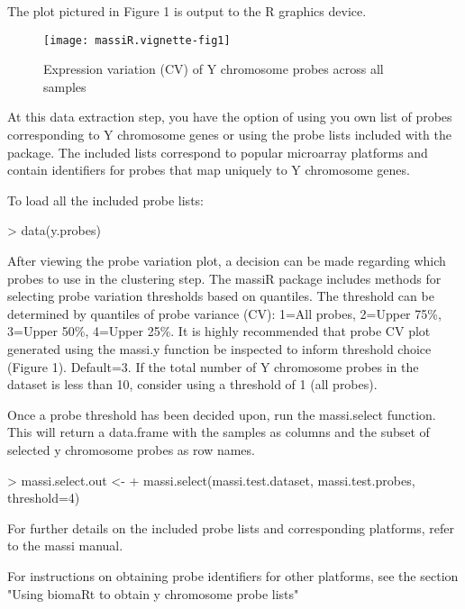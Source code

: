 \documentclass{article}
\begin{document}
The plot pictured in Figure 1 is output to the R graphics device.

\begin{figure}
\begin{center}
\texttt{[image: massiR.vignette-fig1]}
\end{center}
\caption{Expression variation (CV) of Y chromosome probes across all samples}
\label{fig:fig1}
\end{figure}

\clearpage

At this data extraction step, you have the option of using you own list of probes corresponding to Y chromosome genes or using the probe lists included with the package. The included lists correspond to popular microarray platforms and contain identifiers for probes that map uniquely to Y chromosome genes.

To load all the included probe lists:
\begin{Schunk}
\begin{Sinput}
>  data(y.probes)
\end{Sinput}
\end{Schunk}

After viewing the probe variation plot, a decision can be made regarding which probes to use in the clustering step. The massiR package includes methods for selecting probe variation thresholds based on quantiles. The threshold can be determined by quantiles of probe variance (CV): 1=All probes, 2=Upper 75\%, 3=Upper 50\%, 4=Upper 25\%. It is highly recommended that probe CV plot generated using the massi.y function be inspected to inform threshold choice (Figure 1). Default=3. If the total number of Y chromosome probes in the dataset is less than 10, consider using a threshold of 1 (all probes).

Once a probe threshold has been decided upon, run the massi.select function. This will return a data.frame with the samples as columns and the subset of selected y chromosome probes as row names.

\begin{Schunk}
\begin{Sinput}
> massi.select.out <- 
+   massi.select(massi.test.dataset, massi.test.probes, threshold=4)
\end{Sinput}
\end{Schunk}

For further details on the included probe lists and corresponding platforms, refer to the massi manual.

For instructions on obtaining probe identifiers for other platforms, see the section "Using biomaRt to obtain y chromosome probe lists"
\end{document}
